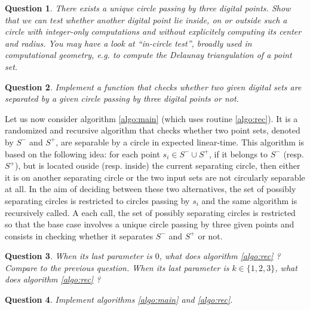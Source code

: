 \documentclass[a4paper, 11pt]{article}
\newtheorem{qu}{Question}
\begin{document}
\begin{qu}
There exists a unique circle passing by three digital points. Show that we can test whether another digital
point lie inside, on or outside such a circle with integer-only computations and without explicitely computing 
its center and radius. You may have a look at ``in-circle test'', broadly used in computational geometry, e.g. 
to compute the Delaunay triangulation of a point set.  
\end{qu}

\begin{qu}
Implement a function that checks whether two given digital sets are separated by a given circle passing by three
digital points or not.  
\end{qu}

Let us now consider algorithm \ref{algo:main} (which uses routine \ref{algo:rec}). 
It is a randomized and recursive algorithm that checks whether two point sets, 
denoted by $S^-$ and $S^+$, are separable by a circle in expected linear-time.  
This algorithm is based on the following idea:
for each point $s_i \in S^- \cup S^+$, if it belongs to $S^-$ (resp. $S^+$), 
but is located ouside (resp. inside) the current separating circle, then either it is on another
separating circle or the two input sets are not circularly separable at all.   
In the aim of deciding between these two alternatives, the set of possibly separating 
circles is restricted to circles passing by $s_i$ and the same algorithm is recursively called. 
A each call, the set of possibly separating circles is restricted so that the base case involves 
a unique circle passing by three given points and consists in checking whether it separates 
$S^-$ and $S^+$ or not.  

\begin{qu}
When its last parameter is $0$, what does algorithm \ref{algo:rec} ? Compare to the previous question.
When its last parameter is $k \in \{1,2,3\}$, what does algorithm \ref{algo:rec} ? 
\end{qu}

\begin{qu}
Implement algorithms \ref{algo:main} and \ref{algo:rec}. 
\end{qu}
\end{document}
